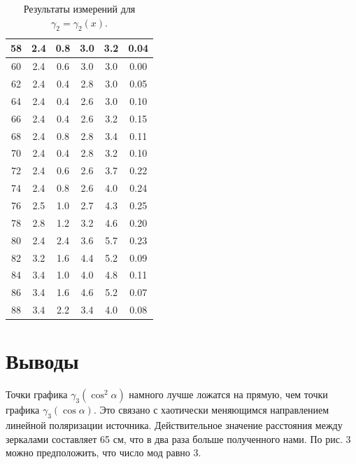 \documentclass[a4paper,12pt]{article}
\begin{document}
\begin{table}[h]
\begin{tabular}{|c|c|c|c|c|c|}
58      & 2.4        & 0.8        & 3.0        & 3.2        & 0.04       \\ \hline
60      & 2.4        & 0.6        & 3.0        & 3.0        & 0.00       \\ \hline
62      & 2.4        & 0.4        & 2.8        & 3.0        & 0.05       \\ \hline
64      & 2.4        & 0.4        & 2.6        & 3.0        & 0.10       \\ \hline
66      & 2.4        & 0.4        & 2.6        & 3.2        & 0.15       \\ \hline
68      & 2.4        & 0.8        & 2.8        & 3.4        & 0.11       \\ \hline
70      & 2.4        & 0.4        & 2.8        & 3.2        & 0.10       \\ \hline
72      & 2.4        & 0.6        & 2.6        & 3.7        & 0.22       \\ \hline
74      & 2.4        & 0.8        & 2.6        & 4.0        & 0.24       \\ \hline
76      & 2.5        & 1.0        & 2.7        & 4.3        & 0.25       \\ \hline
78      & 2.8        & 1.2        & 3.2        & 4.6        & 0.20       \\ \hline
80      & 2.4        & 2.4        & 3.6        & 5.7        & 0.23       \\ \hline
82      & 3.2        & 1.6        & 4.4        & 5.2        & 0.09       \\ \hline
84      & 3.4        & 1.0        & 4.0        & 4.8        & 0.11       \\ \hline
86      & 3.4        & 1.6        & 4.6        & 5.2        & 0.07       \\ \hline
88      & 3.4        & 2.2        & 3.4        & 4.0        & 0.08       \\ \hline
\end{tabular}
\centering
\caption{Результаты измерений для $\gamma_2 = \gamma_2(x)$.}
\end{table}

\section*{Выводы}
	Точки графика $\gamma_3(\cos^2 \alpha)$ намного лучше ложатся на прямую, чем точки графика $\gamma_3(\cos \alpha)$. Это связано с хаотически меняющимся направлением линейной поляризации источника. Действительное значение расстояния между зеркалами составляет 65 см, что в два раза больше полученного нами. По рис. 3 можно предположить, что число мод равно 3.
\end{document}
